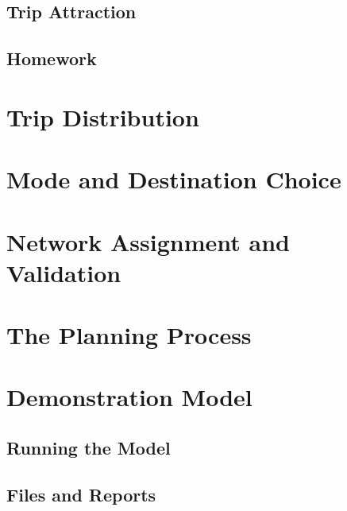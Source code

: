 \documentclass[
]{book}
\begin{document}
\hypertarget{trip-attraction}{%
\section{Trip Attraction}\label{trip-attraction}}

\hypertarget{hw-tripgen}{%
\section*{Homework}\label{hw-tripgen}}

\hypertarget{chap-distribution}{%
\chapter{Trip Distribution}\label{chap-distribution}}

\hypertarget{chap-modechoice}{%
\chapter{Mode and Destination Choice}\label{chap-modechoice}}

\hypertarget{chap-assignment}{%
\chapter{Network Assignment and Validation}\label{chap-assignment}}

\hypertarget{chap-process}{%
\chapter{The Planning Process}\label{chap-process}}

\hypertarget{appendix-appendix}{%
\appendix}


\hypertarget{app-demomodel}{%
\chapter{Demonstration Model}\label{app-demomodel}}

\hypertarget{running-the-model}{%
\section{Running the Model}\label{running-the-model}}

\hypertarget{files-and-reports}{%
\section{Files and Reports}\label{files-and-reports}}
\end{document}
